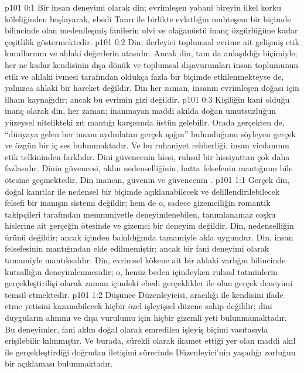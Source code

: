 \vs p101 0:1 Bir insan deneyimi olarak din; evrimleşen yabani bireyin ilkel korku köleliğinden başlayarak, ebedi Tanrı ile birlikte evlatlığın muhteşem bir biçimde bilincinde olan medenileşmiş fanilerin ulvi ve olağanüstü inanç özgürlüğüne kadar çeşitlilik göstermektedir.
\vs p101 0:2 Din; ilerleyici toplumsal evrime ait gelişmiş etik kurallarının ve ahlaki değerlerin atasıdır. Ancak din, tam da anlaşıldığı biçimiyle; her ne kadar kendisinin dışa dönük ve toplumsal dışavurumları insan toplumunun etik ve ahlaki ivmesi tarafından oldukça fazla bir biçimde etkilenmekteyse de, yalnızca ahlaki bir hareket değildir. Din her zaman, insanın evrimleşen doğası için ilham kaynağıdır; ancak bu evrimin gizi değildir.
\vs p101 0:3 Kişiliğin kani olduğu inanç olarak din, her zaman; inanmayan maddi akılda doğan umutsuzluğun yüzeysel nitelikteki zıt mantığı karşısında üstün gelebilir. Orada gerçekten de, “dünyaya gelen her insanı aydınlatan gerçek ışığın” bulunduğunu söyleyen gerçek ve özgün bir iç ses bulunmaktadır. Ve bu ruhaniyet rehberliği, insan vicdanının etik telkininden farklıdır. Dini güvencenin hissi, ruhsal bir hissiyattan çok daha fazlasıdır. Dinin güvencesi, aklın nedenselliğinin, hatta felsefenin mantığının bile ötesine geçmektedir. Din inancın, güvenin ve güvencenin .
\vs p101 1:1 Gerçek din, doğal kanıtlar ile nedensel bir biçimde açıklanabilecek ve delillendirilebilecek felsefi bir inanışın sistemi değildir; hem de o, sadece gizemciliğin romantik takipçileri tarafından memnuniyetle deneyimlenebilen, tanımlanamaz coşku hislerine ait gerçeğin ötesinde ve gizemci bir deneyim değildir. Din, nedenselliğin ürünü değildir; ancak içinden bakıldığında tamamiyle akla uygundur. Din, insan felsefesinin mantığından elde edilmemiştir; ancak bir fani deneyimi olarak tamamiyle mantıksaldır. Din, evrimsel kökene ait bir ahlaki varlığın bilincinde kutsallığın deneyimlenmesidir; o, henüz beden içindeyken ruhsal tatminlerin gerçekleştirilişi olarak zaman içindeki ebedi gerçeklikler ile olan gerçek deneyimi temsil etmektedir.
\vs p101 1:2 Düşünce Düzenleyicisi, aracılığı ile kendisini ifade etme yetisini kazanabilecek hiçbir özel işleyişsel düzene sahip değildir; dini duyguların alınımı ve dışa vurulumu için hiçbir gizemli yeti bulunmamaktadır. Bu deneyimler, fani aklın doğal olarak emredilen işleyiş biçimi vasıtasıyla erişilebilir kılınmıştır. Ve burada, sürekli olarak ikamet ettiği yer olan maddi akıl ile gerçekleştirdiği doğrudan iletişimi sürecinde Düzenleyici’nin yaşadığı zorluğun bir açıklaması bulunmaktadır.
